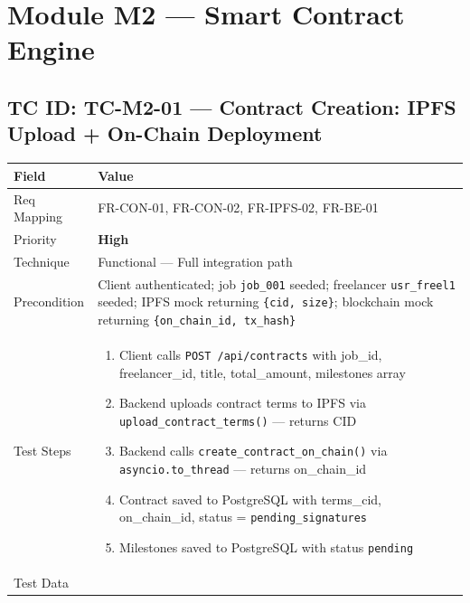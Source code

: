 \documentclass[12pt,a4paper]{article}
\newcommand{\sevhigh}{\textcolor{severityhigh}{\textbf{High}}}
\begin{document}
\newpage

\section{Module M2 --- Smart Contract Engine}

\subsection{TC ID: TC-M2-01 --- Contract Creation: IPFS Upload + On-Chain Deployment}

\begin{tabular}{|p{}|p{}|}
\hline
\rowcolor{lightblue} \textbf{Field} & \textbf{Value} \\
\hline
Req Mapping & FR-CON-01, FR-CON-02, FR-IPFS-02, FR-BE-01 \\
\hline
Priority & \sevhigh \\
\hline
Technique & Functional --- Full integration path \\
\hline
Precondition & Client authenticated; job \texttt{job\_001} seeded; freelancer \texttt{usr\_freel1} seeded; IPFS mock returning \texttt{\{cid, size\}}; blockchain mock returning \texttt{\{on\_chain\_id, tx\_hash\}} \\
\hline
Test Steps &
\begin{enumerate}[nosep, leftmargin=*]
  \item Client calls \texttt{POST /api/contracts} with job\_id, freelancer\_id, title, total\_amount, milestones array
  \item Backend uploads contract terms to IPFS via \texttt{upload\_contract\_terms()} --- returns CID
  \item Backend calls \texttt{create\_contract\_on\_chain()} via \texttt{asyncio.to\_thread} --- returns on\_chain\_id
  \item Contract saved to PostgreSQL with terms\_cid, on\_chain\_id, status = \texttt{pending\_signatures}
  \item Milestones saved to PostgreSQL with status \texttt{pending}
\end{enumerate} \\
\hline
Test Data &
\begin{itemize}[nosep, leftmargin=*]

\end{itemize}
\end{tabular}
\end{document}
